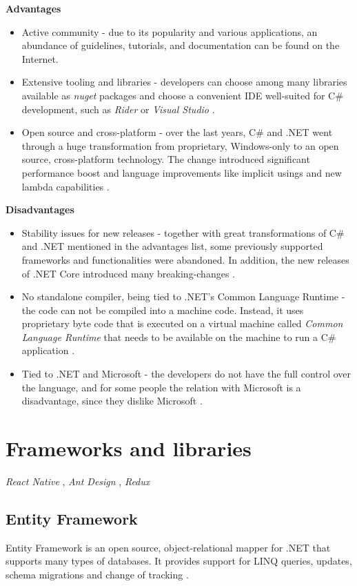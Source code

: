 \textbf{Advantages}
\begin{itemize}
    \item Active community - due to its popularity and various applications, an abundance of guidelines, tutorials, and documentation can be found on the Internet.
    \item Extensive tooling and libraries - developers can choose among many libraries available as \textit{nuget} packages and choose a convenient IDE well-suited for C\# development, such as \textit{Rider} or \textit{Visual Studio}  \cite{net-tools} \cite{nuget}.
    \item Open source and cross-platform - over the last years, C\# and .NET went through a huge transformation from proprietary, Windows-only to an open source, cross-platform technology. The change introduced significant performance boost and language improvements like implicit usings and new lambda capabilities \cite{net6}. 
\end{itemize}

\textbf{Disadvantages}
\begin{itemize}
    \item Stability issues for new releases - together with great transformations of C\# and .NET mentioned in the advantages list, some previously supported frameworks and functionalities were abandoned. In addition, the new releases of .NET Core introduced many breaking-changes \cite{net-breaking-changes}. 
    \item No standalone compiler, being tied to .NET's Common Language Runtime - the code can not be compiled into a machine code. Instead, it uses proprietary byte code that is executed on a virtual machine called \textit{Common Language Runtime} that needs to be available on the machine to run a C\# application \cite{c-sharp-tour}.
    \item Tied to .NET and Microsoft - the developers do not have the full control over the language, and for some people the relation with Microsoft is a disadvantage, since they dislike Microsoft .
\end{itemize}

\section{Frameworks and libraries}
 \textit{React Native} \cite{react_native}, \textit{Ant Design} \cite{ant_design}, \textit{Redux} \cite{redux}

\subsection{Entity Framework}
Entity Framework is an open source, object-relational mapper for .NET that supports many types of databases. It provides support for LINQ queries, updates, schema migrations and change of tracking \cite{ef}\cite{ef-doc}. 

